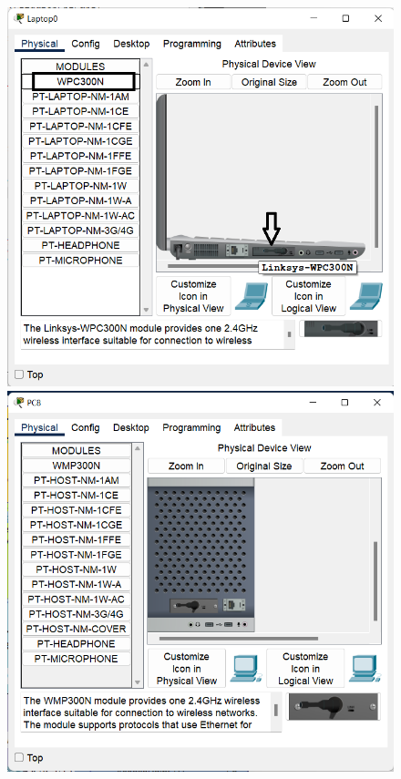 \begin{enumerate}
\begin{enumerate}
\begin{figure}[H]
\begin{center}
\includegraphics[scale=.6]{../figures/p2/ap4}
\includegraphics[scale=.6]{../figures/p2/ap9}

\end{center}
\end{figure}
\end{enumerate}
\end{enumerate}
